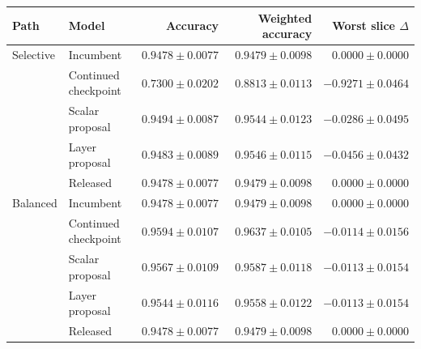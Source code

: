\begin{tabular}{llrrr}
\toprule
Path & Model & Accuracy & Weighted accuracy & Worst slice $\Delta$ \\
\midrule
Selective & Incumbent & $0.9478\pm0.0077$ & $0.9479\pm0.0098$ & $0.0000\pm0.0000$ \\
 & Continued checkpoint & $0.7300\pm0.0202$ & $0.8813\pm0.0113$ & $-0.9271\pm0.0464$ \\
 & Scalar proposal & $0.9494\pm0.0087$ & $0.9544\pm0.0123$ & $-0.0286\pm0.0495$ \\
 & Layer proposal & $0.9483\pm0.0089$ & $0.9546\pm0.0115$ & $-0.0456\pm0.0432$ \\
 & Released & $0.9478\pm0.0077$ & $0.9479\pm0.0098$ & $0.0000\pm0.0000$ \\
\midrule
Balanced & Incumbent & $0.9478\pm0.0077$ & $0.9479\pm0.0098$ & $0.0000\pm0.0000$ \\
 & Continued checkpoint & $0.9594\pm0.0107$ & $0.9637\pm0.0105$ & $-0.0114\pm0.0156$ \\
 & Scalar proposal & $0.9567\pm0.0109$ & $0.9587\pm0.0118$ & $-0.0113\pm0.0154$ \\
 & Layer proposal & $0.9544\pm0.0116$ & $0.9558\pm0.0122$ & $-0.0113\pm0.0154$ \\
 & Released & $0.9478\pm0.0077$ & $0.9479\pm0.0098$ & $0.0000\pm0.0000$ \\
\bottomrule
\end{tabular}
